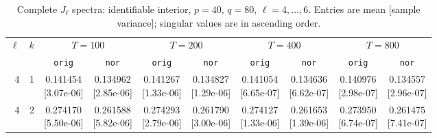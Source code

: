 \documentclass[12pt,letterpaper]{article}
\def\spacingset#1{\renewcommand{\baselinestretch}{#1}\small\normalsize}
\theoremstyle{plain}
\theoremstyle{definition}
\begin{document}
\clearpage
\begin{table}[p]
\begingroup
\spacingset{1.0}
\small\centering
\caption{Complete $J_\ell$ spectra: identifiable interior, $p=40$, $q=80$, $\ell=4,\ldots,6$. Entries are mean [sample variance]; singular values are in ascending order.}
\label{s23:lambda:alltab:spectra:p40q80interior:4-6}
\footnotesize
\setlength{\tabcolsep}{2.2pt}
\renewcommand{\arraystretch}{1.03}
\begin{adjustbox}{max width=\linewidth}
\begin{tabular}{@{}rr*{8}{c}@{}}
\toprule
$\ell$ & $k$ & \multicolumn{2}{c}{$T=100$} & \multicolumn{2}{c}{$T=200$} & \multicolumn{2}{c}{$T=400$} & \multicolumn{2}{c}{$T=800$}\\
\cmidrule(lr){3-4}\cmidrule(lr){5-6}\cmidrule(lr){7-8}\cmidrule(lr){9-10}
 &  & \texttt{orig} & \texttt{nor} & \texttt{orig} & \texttt{nor} & \texttt{orig} & \texttt{nor} & \texttt{orig} & \texttt{nor}\\
\midrule
4 & 1 & \shortstack{0.141454\\[-1pt]{\scriptsize[3.07e-06]}} & \shortstack{0.134962\\[-1pt]{\scriptsize[2.85e-06]}} & \shortstack{0.141267\\[-1pt]{\scriptsize[1.33e-06]}} & \shortstack{0.134827\\[-1pt]{\scriptsize[1.29e-06]}} & \shortstack{0.141054\\[-1pt]{\scriptsize[6.65e-07]}} & \shortstack{0.134636\\[-1pt]{\scriptsize[6.62e-07]}} & \shortstack{0.140976\\[-1pt]{\scriptsize[2.98e-07]}} & \shortstack{0.134557\\[-1pt]{\scriptsize[2.96e-07]}}\\
4 & 2 & \shortstack{0.274170\\[-1pt]{\scriptsize[5.50e-06]}} & \shortstack{0.261588\\[-1pt]{\scriptsize[5.82e-06]}} & \shortstack{0.274293\\[-1pt]{\scriptsize[2.79e-06]}} & \shortstack{0.261790\\[-1pt]{\scriptsize[3.00e-06]}} & \shortstack{0.274127\\[-1pt]{\scriptsize[1.33e-06]}} & \shortstack{0.261653\\[-1pt]{\scriptsize[1.39e-06]}} & \shortstack{0.273950\\[-1pt]{\scriptsize[6.74e-07]}} & \shortstack{0.261475\\[-1pt]{\scriptsize[7.41e-07]}}\\

\end{tabular}
\end{adjustbox}
\end{table}
\end{document}
